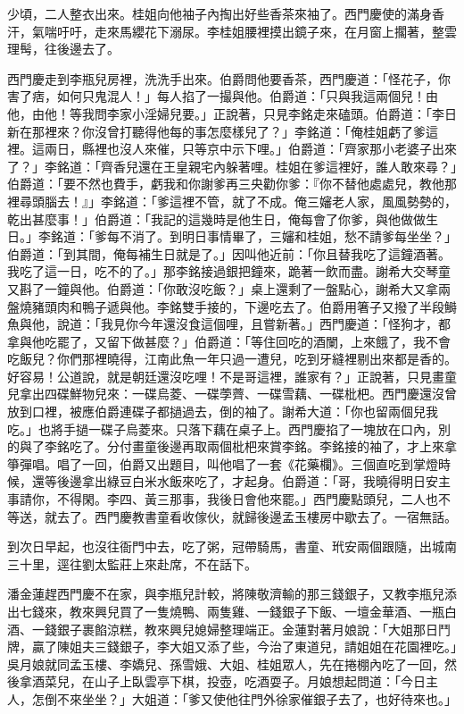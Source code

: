 少頃，二人整衣出來。桂姐向他袖子內掏出好些香茶來袖了。西門慶使的滿身香汗，氣喘吁吁，走來馬纓花下溺尿。李桂姐腰裡摸出鏡子來，在月窗上擱著，整雲理髩，往後邊去了。

西門慶走到李瓶兒房裡，洗洗手出來。伯爵問他要香茶，西門慶道：「怪花子，你害了痞，如何只鬼混人！」每人掐了一撮與他。伯爵道：「只與我這兩個兒！由他，由他！等我問李家小淫婦兒要。」正說著，只見李銘走來磕頭。伯爵道：「李日新在那裡來？你沒曾打聽得他每的事怎麼樣兒了？」李銘道：「俺桂姐虧了爹這裡。這兩日，縣裡也沒人來催，只等京中示下哩。」伯爵道：「齊家那小老婆子出來了？」李銘道：「齊香兒還在王皇親宅內躲著哩。桂姐在爹這裡好，誰人敢來尋？」伯爵道：「要不然也費手，虧我和你謝爹再三央勸你爹：『你不替他處處兒，教他那裡尋頭腦去！』」李銘道：「爹這裡不管，就了不成。俺三嬸老人家，風風勢勢的，乾出甚麼事！」伯爵道：「我記的這幾時是他生日，俺每會了你爹，與他做做生日。」李銘道：「爹每不消了。到明日事情畢了，三嬸和桂姐，愁不請爹每坐坐？」伯爵道：「到其間，俺每補生日就是了。」因叫他近前：「你且替我吃了這鐘酒著。我吃了這一日，吃不的了。」那李銘接過銀把鐘來，跪著一飲而盡。謝希大交琴童又斟了一鐘與他。伯爵道：「你敢沒吃飯？」桌上還剩了一盤點心，謝希大又拿兩盤燒豬頭肉和鴨子遞與他。李銘雙手接的，下邊吃去了。伯爵用箸子又撥了半段鰣魚與他，說道：「我見你今年還沒食這個哩，且嘗新著。」西門慶道：「怪狗才，都拿與他吃罷了，又留下做甚麼？」伯爵道：「等住回吃的酒闌，上來餓了，我不會吃飯兒？你們那裡曉得，江南此魚一年只過一遭兒，吃到牙縫裡剔出來都是香的。好容易！公道說，就是朝廷還沒吃哩！不是哥這裡，誰家有？」正說著，只見畫童兒拿出四碟鮮物兒來：一碟烏菱、一碟荸薺、一碟雪藕、一碟枇杷。西門慶還沒曾放到口裡，被應伯爵連碟子都撾過去，倒的袖了。謝希大道：「你也留兩個兒我吃。」也將手撾一碟子烏菱來。只落下藕在桌子上。西門慶掐了一塊放在口內，別的與了李銘吃了。分付畫童後邊再取兩個枇杷來賞李銘。李銘接的袖了，才上來拿箏彈唱。唱了一回，伯爵又出題目，叫他唱了一套《花藥欄》。三個直吃到掌燈時候，還等後邊拿出綠豆白米水飯來吃了，才起身。伯爵道：「哥，我曉得明日安主事請你，不得閑。李四、黃三那事，我後日會他來罷。」西門慶點頭兒，二人也不等送，就去了。西門慶教書童看收傢伙，就歸後邊孟玉樓房中歇去了。一宿無話。

到次日早起，也沒往衙門中去，吃了粥，冠帶騎馬，書童、玳安兩個跟隨，出城南三十里，逕往劉太監莊上來赴席，不在話下。

潘金蓮趕西門慶不在家，與李瓶兒計較，將陳敬濟輸的那三錢銀子，又教李瓶兒添出七錢來，教來興兒買了一隻燒鴨、兩隻雞、一錢銀子下飯、一壇金華酒、一瓶白酒、一錢銀子裹餡涼糕，教來興兒媳婦整理端正。金蓮對著月娘說：「大姐那日鬥牌，贏了陳姐夫三錢銀子，李大姐又添了些，今治了東道兒，請姐姐在花園裡吃。」吳月娘就同孟玉樓、李嬌兒、孫雪娥、大姐、桂姐眾人，先在捲棚內吃了一回，然後拿酒菜兒，在山子上臥雲亭下棋，投壺，吃酒耍子。月娘想起問道：「今日主人，怎倒不來坐坐？」大姐道：「爹又使他往門外徐家催銀子去了，也好待來也。」

